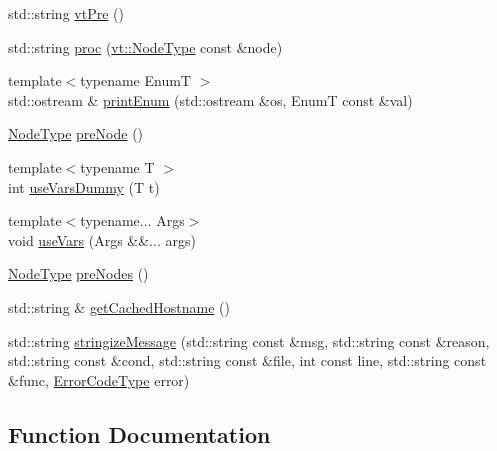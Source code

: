 \begin{DoxyCompactItemize}
\item 
std\+::string \hyperlink{namespacevt_1_1debug_acfaac527e91984bde40775eb9b4372ef}{vt\+Pre} ()
\item 
std\+::string \hyperlink{namespacevt_1_1debug_a13a11e278ff8e5a4093396437511aeb7}{proc} (\hyperlink{namespacevt_a866da9d0efc19c0a1ce79e9e492f47e2}{vt\+::\+Node\+Type} const \&node)
\item 
{\footnotesize template$<$typename EnumT $>$ }\\std\+::ostream \& \hyperlink{namespacevt_1_1debug_afaa2c8383e718071689dfea2c959a467}{print\+Enum} (std\+::ostream \&os, EnumT const \&val)
\item 
\hyperlink{namespacevt_a866da9d0efc19c0a1ce79e9e492f47e2}{Node\+Type} \hyperlink{namespacevt_1_1debug_a0f9acc324c2b3308760aa13b29dd9736}{pre\+Node} ()
\item 
{\footnotesize template$<$typename T $>$ }\\int \hyperlink{namespacevt_1_1debug_a4417ee390fd826c2135e06abe59719dd}{use\+Vars\+Dummy} (T t)
\item 
{\footnotesize template$<$typename... Args$>$ }\\void \hyperlink{namespacevt_1_1debug_aeff93f73b5ac173a53dcf778ff771c2e}{use\+Vars} (Args \&\&... args)
\item 
\hyperlink{namespacevt_a866da9d0efc19c0a1ce79e9e492f47e2}{Node\+Type} \hyperlink{namespacevt_1_1debug_ab9a204b679ea705a255d3cb4dcce02f3}{pre\+Nodes} ()
\item 
std\+::string \& \hyperlink{namespacevt_1_1debug_a24ece85f97b2cbc60968d3cf21b36be6}{get\+Cached\+Hostname} ()
\item 
std\+::string \hyperlink{namespacevt_1_1debug_a63b47ef166cce2fe27d4fbc366a2e23c}{stringize\+Message} (std\+::string const \&msg, std\+::string const \&reason, std\+::string const \&cond, std\+::string const \&file, int const line, std\+::string const \&func, \hyperlink{namespacevt_a793764d753923abc3d32929870beb485}{Error\+Code\+Type} error)
\end{DoxyCompactItemize}


\subsection{Function Documentation}
\mbox{\label{namespacevt_1_1debug_a26f95b8d5da98fa54a335789b18fb3d3}} 
